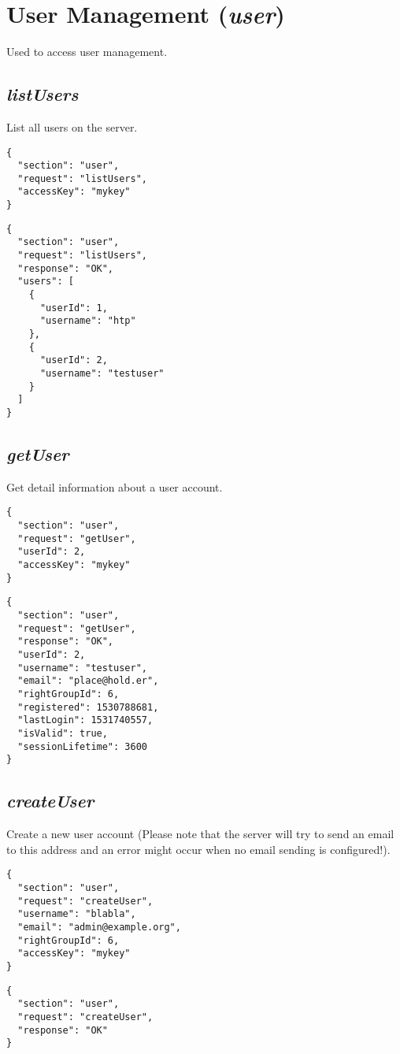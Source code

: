 \section*{User Management (\textit{user})}
	Used to access user management.

\subsection*{\textit{listUsers}}
	List all users on the server.
	{
		\color{blue}
		\begin{verbatim}
{
  "section": "user",
  "request": "listUsers",
  "accessKey": "mykey"
}
		\end{verbatim}
	}
	{
		\color{OliveGreen}
		\begin{verbatim}
{
  "section": "user",
  "request": "listUsers",
  "response": "OK",
  "users": [
    {
      "userId": 1,
      "username": "htp"
    },
    {
      "userId": 2,
      "username": "testuser"
    }
  ]
}
		\end{verbatim}
	}
\subsection*{\textit{getUser}}
	Get detail information about a user account.
	{
		\color{blue}
		\begin{verbatim}
{
  "section": "user",
  "request": "getUser",
  "userId": 2,
  "accessKey": "mykey"
}
		\end{verbatim}
	}
	{
		\color{OliveGreen}
		\begin{verbatim}
{
  "section": "user",
  "request": "getUser",
  "response": "OK",
  "userId": 2,
  "username": "testuser",
  "email": "place@hold.er",
  "rightGroupId": 6,
  "registered": 1530788681,
  "lastLogin": 1531740557,
  "isValid": true,
  "sessionLifetime": 3600
}
		\end{verbatim}
	}
\subsection*{\textit{createUser}}
	Create a new user account (Please note that the server will try to send an email to this address and an error might occur when no email sending is configured!).
	{
		\color{blue}
		\begin{verbatim}
{
  "section": "user",
  "request": "createUser",
  "username": "blabla",
  "email": "admin@example.org",
  "rightGroupId": 6,
  "accessKey": "mykey"
}
		\end{verbatim}
	}
	{
		\color{OliveGreen}
		\begin{verbatim}
{
  "section": "user",
  "request": "createUser",
  "response": "OK"
}
		\end{verbatim}
	}
